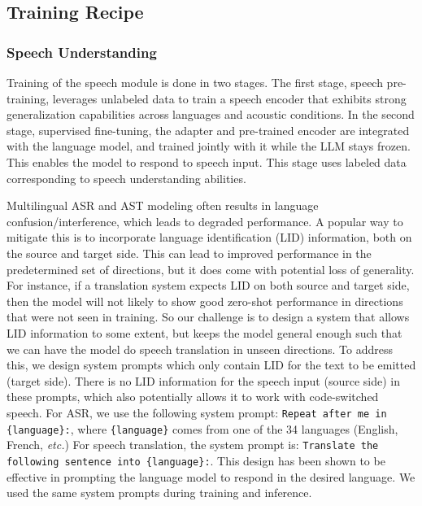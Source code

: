 \documentclass[dvipsnames]{fairmeta}
\begin{document}
\subsection{Training Recipe}

\subsubsection{Speech Understanding}

Training of the speech module is done in two stages.
The first stage, speech pre-training, leverages unlabeled data to train a speech encoder that exhibits strong generalization capabilities across languages and acoustic conditions.
In the second stage, supervised fine-tuning, the adapter and pre-trained encoder are integrated with the language model, and trained jointly with it while the LLM stays frozen. This enables the model to respond to speech input.
This stage uses labeled data corresponding to speech understanding abilities.

Multilingual ASR and AST modeling often results in language confusion/interference, which leads to degraded performance. A popular way to mitigate this is to incorporate language identification (LID) information, both on the source and target side. This can lead to improved performance in the predetermined set of directions, but it does come with potential loss of generality. For instance, if a translation system expects LID on both source and target side, then the model will not likely to show good zero-shot performance in directions that were not seen in training.
So our challenge is to design a system that allows LID information to some extent, but keeps the model general enough such that we can have the model do speech translation in unseen directions.
To address this, we design system prompts which only contain LID for the text to be emitted (target side). There is no LID information for the speech input (source side) in these prompts, which also potentially allows it to work with code-switched speech.
For ASR, we use the following system prompt: {\tt Repeat after me in \{language\}:},
where {\tt \{language\}} comes from one of the 34 languages (English, French, \emph{etc.})
For speech translation, the system prompt is: {\tt Translate the following sentence into \{language\}:}.
This design has been shown to be effective in prompting the language model to respond in the desired language.
We used the same system prompts during training and inference.
\end{document}
